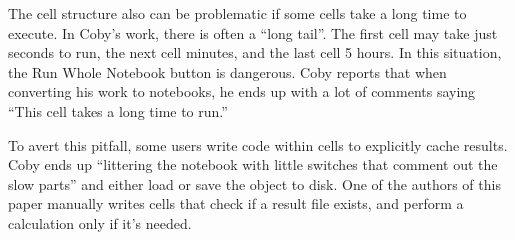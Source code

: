 The cell structure also can be problematic if some cells take a long time to
execute. In Coby's work, there is often a ``long tail''.  The first cell may
take just seconds to run, the next cell minutes, and the last cell 5 hours.
In this situation, the Run Whole Notebook button is dangerous.
Coby reports that when converting his work to notebooks, he
ends up with a lot of comments saying ``This cell takes a long time to run.''

To avert this pitfall, some users write code within cells to explicitly cache results.
Coby ends up ``littering the notebook with little switches that comment out the
slow parts'' and either load or save the object to disk. One of the authors of this paper
manually writes cells that check if a result file exists, and perform a calculation only
if it's needed.









